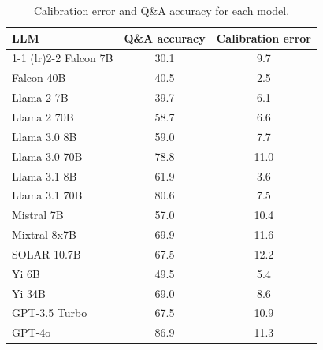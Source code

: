 \begin{table}[h]
\caption{Calibration error and Q\&A accuracy for each model.}
\label{tab:calibration_platt_prob_max_k20}
\centering
\begin{tabular}{lcc}
\toprule
LLM & Q\&A accuracy & Calibration error \\ 
\cmidrule(lr){1-1} \cmidrule(lr){2-2} 
Falcon 7B & 30.1 & 9.7\\
Falcon 40B & 40.5 & 2.5\\
Llama 2 7B & 39.7 & 6.1\\
Llama 2 70B & 58.7 & 6.6\\
Llama 3.0 8B & 59.0 & 7.7\\
Llama 3.0 70B & 78.8 & 11.0\\
Llama 3.1 8B & 61.9 & 3.6\\
Llama 3.1 70B & 80.6 & 7.5\\
Mistral 7B & 57.0 & 10.4\\
Mixtral 8x7B & 69.9 & 11.6\\
SOLAR 10.7B & 67.5 & 12.2\\
Yi 6B & 49.5 & 5.4\\
Yi 34B & 69.0 & 8.6\\
GPT-3.5 Turbo & 67.5 & 10.9\\
GPT-4o & 86.9 & 11.3\\
\bottomrule
\end{tabular}
\end{table}
